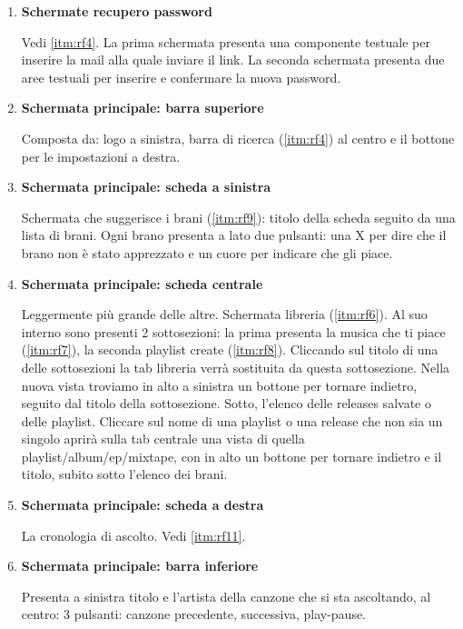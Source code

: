 \documentclass[a4paper,12pt]{article}
\begin{document}
\begin{enumerate}[label=\textbf{FE\arabic*}\;, ref=\textbf{FE\arabic*}]
    \item \label{itm:fe4} \textbf{Schermate recupero password}
    
    Vedi \ref{itm:rf4}. La prima schermata presenta una componente testuale per inserire la mail alla quale inviare il link. La seconda schermata presenta due aree testuali per inserire e confermare la nuova password.
    \item \label{itm:fe5} \textbf{Schermata principale: barra superiore}
    
    Composta da: logo a sinistra, barra di ricerca (\ref{itm:rf4}) al centro e il bottone per le impostazioni a destra. 
    \item \label{itm:fe6} \textbf{Schermata principale: scheda a sinistra}
    
    Schermata che suggerisce i brani (\ref{itm:rf9}): titolo della scheda seguito da una lista di brani. Ogni brano presenta a lato due pulsanti: una X per dire che il brano non è stato apprezzato e un cuore per indicare che gli piace.
    \item \label{itm:fe7} \textbf{Schermata principale: scheda centrale}
    
    Leggermente più grande delle altre. Schermata libreria (\ref{itm:rf6}). Al suo interno sono presenti 2 sottosezioni: la prima presenta la musica che ti piace (\ref{itm:rf7}), la seconda playlist create (\ref{itm:rf8}). Cliccando sul titolo di una delle sottosezioni la tab libreria verrà sostituita da questa sottosezione. Nella nuova vista troviamo in alto a sinistra un bottone per tornare indietro, seguito dal titolo della sottosezione. Sotto, l’elenco delle releases salvate o delle playlist. Cliccare sul nome di una playlist o una release che non sia un singolo aprirà sulla tab centrale una vista di quella playlist/album/ep/mixtape, con in alto un bottone per tornare indietro e il titolo, subito sotto l'elenco dei brani.
    \item \label{itm:fe8} \textbf{Schermata principale: scheda a destra}
    
    La cronologia di ascolto. Vedi \ref{itm:rf11}.
    \item \label{itm:fe9} \textbf{Schermata principale: barra inferiore}
    
    Presenta a sinistra titolo e l’artista della canzone che si sta ascoltando, al centro: 3 pulsanti: canzone precedente, successiva, play-pause.


\end{enumerate}
\end{document}
